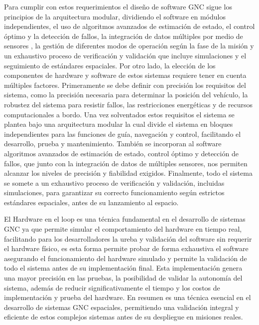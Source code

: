\documentclass[12pt]{article}
\begin{document}
Para cumplir con estos requerimientos el diseño de software GNC sigue los principios de la arquitectura modular, dividiendo el software en módulos independientes, el uso de algoritmos avanzados de estimación de estado, el control óptimo y la detección de fallos, la integración  de datos múltiples por medio de sensores , la gestión de diferentes modos de operación según la fase de la misión y un exhaustivo proceso de verificación y validación que incluye simulaciones y el seguimiento de estándares espaciales. Por otro lado, la elección de los componentes de hardware y software de estos sistemas requiere tener en cuenta múltiples factores. Primeramente se debe definir con precisión los requisitos del sistema, como la precisión necesaria para determinar la posición del vehículo, la robustez del sistema para resistir fallos, las restricciones energéticas y de recursos computacionales a bordo. Una vez solventados estos requisitos el sistema se plantea bajo una arquitectura modular la cual divide el sistema en bloques independientes para las funciones de guía, navegación y control, facilitando el desarrollo, prueba y mantenimiento. También se incorporan al software algoritmos avanzados de estimación de estado, control óptimo y detección de fallos, que junto con la integración de datos de múltiples sensores, nos permiten alcanzar los niveles de precisión y fiabilidad exigidos. Finalmente, todo el sistema se somete a un exhaustivo proceso de verificación y validación, incluidas simulaciones, para garantizar su correcto funcionamiento según estrictos estándares espaciales, antes de su lanzamiento al espacio.


El Hardware en el loop es una técnica fundamental en el desarrollo de sistemas GNC ya que permite simular el comportamiento del hardware en tiempo real, facilitando para los desarrolladores la ureba y validación del software sin requerir el hardware físico, es esta forma permite probar de forma exhaustiva el software asegurando el funcionamiento del hardware simulado y permite la validación de todo el sistema antes de su implementación final. Esta implementación genera una mayor precisión en las pruebas, la posibilidad de validar la autonomía del sistema, además de reducir significativamente el tiempo y los costos de implementación y prueba del hardware. En resumen es una técnica esencial en el desarrollo de sistemas GNC espaciales, permitiendo una validación integral y eficiente de estos complejos sistemas antes de su despliegue en misiones reales.
\end{document}
